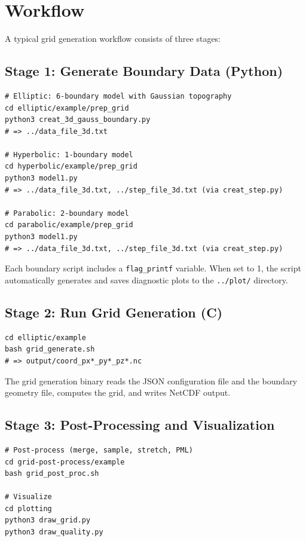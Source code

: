 \documentclass[11pt,a4paper]{report}
\begin{document}
\section{Workflow}

A typical grid generation workflow consists of three stages:

\subsection{Stage 1: Generate Boundary Data (Python)}

\begin{lstlisting}[style=bash]
# Elliptic: 6-boundary model with Gaussian topography
cd elliptic/example/prep_grid
python3 creat_3d_gauss_boundary.py
# => ../data_file_3d.txt

# Hyperbolic: 1-boundary model
cd hyperbolic/example/prep_grid
python3 model1.py
# => ../data_file_3d.txt, ../step_file_3d.txt (via creat_step.py)

# Parabolic: 2-boundary model
cd parabolic/example/prep_grid
python3 model1.py
# => ../data_file_3d.txt, ../step_file_3d.txt (via creat_step.py)
\end{lstlisting}

Each boundary script includes a \texttt{flag\_printf} variable. When set to 1, the script automatically generates and saves diagnostic plots to the \texttt{../plot/} directory.

\subsection{Stage 2: Run Grid Generation (C)}

\begin{lstlisting}[style=bash]
cd elliptic/example
bash grid_generate.sh
# => output/coord_px*_py*_pz*.nc
\end{lstlisting}

The grid generation binary reads the JSON configuration file and the boundary geometry file, computes the grid, and writes NetCDF output.

\subsection{Stage 3: Post-Processing and Visualization}

\begin{lstlisting}[style=bash]
# Post-process (merge, sample, stretch, PML)
cd grid-post-process/example
bash grid_post_proc.sh

# Visualize
cd plotting
python3 draw_grid.py
python3 draw_quality.py
\end{lstlisting}
\end{document}
